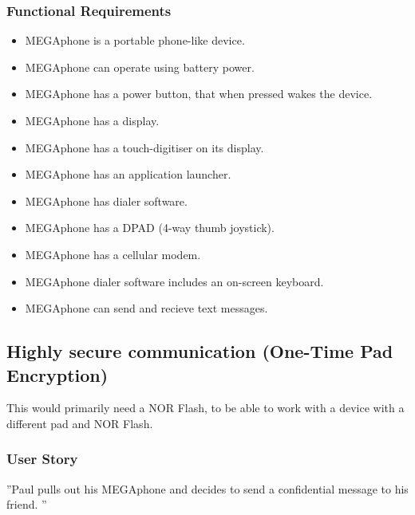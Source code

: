         \subsubsection{Functional Requirements}
        \begin{itemize}
        \item MEGAphone is a portable phone-like device.
        \item MEGAphone can operate using battery power.
        \item MEGAphone has a power button, that when pressed wakes the device.
        \item MEGAphone has a display.
        \item MEGAphone has a touch-digitiser on its display.
        \item MEGAphone has an application launcher.
        \item MEGAphone has dialer software.
        \item MEGAphone has a DPAD (4-way thumb joystick).
        \item MEGAphone has a cellular modem.
	\item MEGAphone dialer software includes an on-screen keyboard.
	\item MEGAphone can send and recieve text messages.
        \end{itemize}

\subsection{Highly secure communication (One-Time Pad Encryption)}
	This would primarily need a NOR Flash, to be able to work with a device with a different pad and NOR Flash.\\

	\subsubsection{User Story}
	''Paul pulls out his MEGAphone and decides to send a confidential message to his friend. ''

